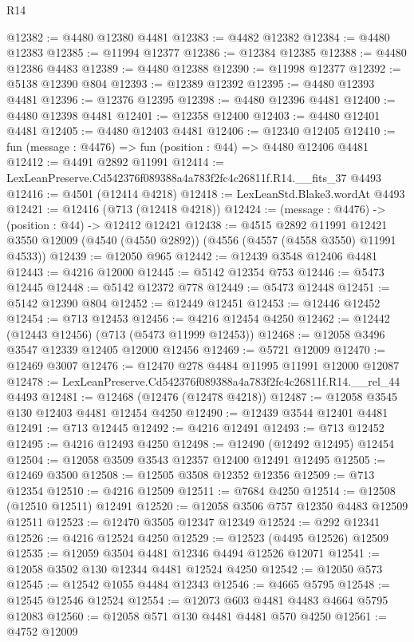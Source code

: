 \begin{lexlean}{R14}
\begin{coremodule}
@12382 := @4480 @12380 @4481
@12383 := @4482 @12382
@12384 := @4480 @12383
@12385 := @11994 @12377
@12386 := @12384 @12385
@12388 := @4480 @12386 @4483
@12389 := @4480 @12388
@12390 := @11998 @12377
@12392 := @5138 @12390 @804
@12393 := @12389 @12392
@12395 := @4480 @12393 @4481
@12396 := @12376 @12395
@12398 := @4480 @12396 @4481
@12400 := @4480 @12398 @4481
@12401 := @12358 @12400
@12403 := @4480 @12401 @4481
@12405 := @4480 @12403 @4481
@12406 := @12340 @12405
@12410 := fun (message : @4476) => fun (position : @44) => @4480 @12406 @4481
@12412 := @4491 @2892 @11991
@12414 := LexLeanPreserve.Cd542376f089388a4a783f2fc4c26811f.R14.__fits_37 @4493
@12416 := @4501 (@12414 @4218)
@12418 := LexLeanStd.Blake3.wordAt @4493
@12421 := @12416 (@713 (@12418 @4218))
@12424 := (message : @4476) -> (position : @44) -> @12412 @12421
@12438 := @4515
    @2892
    @11991
    @12421
    @3550
    @12009
    (@4540 (@4550 @2892))
    (@4556 (@4557 (@4558 @3550) @11991 @4533))
@12439 := @12050 @965
@12442 := @12439 @3548 @12406 @4481
@12443 := @4216 @12000
@12445 := @5142 @12354 @753
@12446 := @5473 @12445
@12448 := @5142 @12372 @778
@12449 := @5473 @12448
@12451 := @5142 @12390 @804
@12452 := @12449 @12451
@12453 := @12446 @12452
@12454 := @713 @12453
@12456 := @4216 @12454 @4250
@12462 := @12442 (@12443 @12456) (@713 (@5473 @11999 @12453))
@12468 := @12058 @3496 @3547 @12339 @12405 @12000 @12456
@12469 := @5721 @12009
@12470 := @12469 @3007
@12476 := @12470 @278 @4484 @11995 @11991 @12000 @12087
@12478 := LexLeanPreserve.Cd542376f089388a4a783f2fc4c26811f.R14.__rel_44 @4493
@12481 := @12468 (@12476 (@12478 @4218))
@12487 := @12058 @3545 @130 @12403 @4481 @12454 @4250
@12490 := @12439 @3544 @12401 @4481
@12491 := @713 @12445
@12492 := @4216 @12491
@12493 := @713 @12452
@12495 := @4216 @12493 @4250
@12498 := @12490 (@12492 @12495) @12454
@12504 := @12058 @3509 @3543 @12357 @12400 @12491 @12495
@12505 := @12469 @3500
@12508 := @12505 @3508 @12352 @12356
@12509 := @713 @12354
@12510 := @4216 @12509
@12511 := @7684 @4250
@12514 := @12508 (@12510 @12511) @12491
@12520 := @12058 @3506 @757 @12350 @4483 @12509 @12511
@12523 := @12470 @3505 @12347 @12349
@12524 := @292 @12341
@12526 := @4216 @12524 @4250
@12529 := @12523 (@4495 @12526) @12509
@12535 := @12059 @3504 @4481 @12346 @4494 @12526 @12071
@12541 := @12058 @3502 @130 @12344 @4481 @12524 @4250
@12542 := @12050 @573
@12545 := @12542 @1055 @4484 @12343
@12546 := @4665 @5795
@12548 := @12545 @12546 @12524
@12554 := @12073 @603 @4481 @4483 @4664 @5795 @12083
@12560 := @12058 @571 @130 @4481 @4481 @570 @4250
@12561 := @4752 @12009

\end{coremodule}
\end{lexlean}
